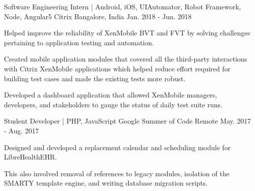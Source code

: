 

\begin{cventries}

  \cventry
    {Software Engineering Intern | Android, iOS, UIAutomator, Robot Framework, Node, Angular5} %
    {Citrix} %
    {Bangalore, India} %
    {Jan. 2018 - Jun. 2018} %
    {
      \begin{cvitems} %
      	\item {Helped improve the reliability of XenMobile BVT and FVT by solving challenges pertaining to application testing and automation.}
      	\item {Created mobile application modules that covered all the third-party interactions with Citrix XenMobile applications which helped reduce effort required for building test cases and made the existing tests more robust. }
        \item {Developed a dashboard application that allowed XenMobile managers, developers, and stakeholders to gauge the status of daily test suite runs.}
      \end{cvitems}
    }

  \cventry
    {Student Developer | PHP, JavaScript} %
    {Google Summer of Code} %
    {Remote} %
    {May. 2017 - Aug. 2017} %
    {
      \begin{cvitems} %
        \item {Designed and developed a replacement calendar and scheduling module for LibreHealthEHR.}
        \item {This also involved removal of references to legacy modules, isolation of the SMARTY template engine, and writing database migration scripts.}
      \end{cvitems}
    }


\end{cventries}

